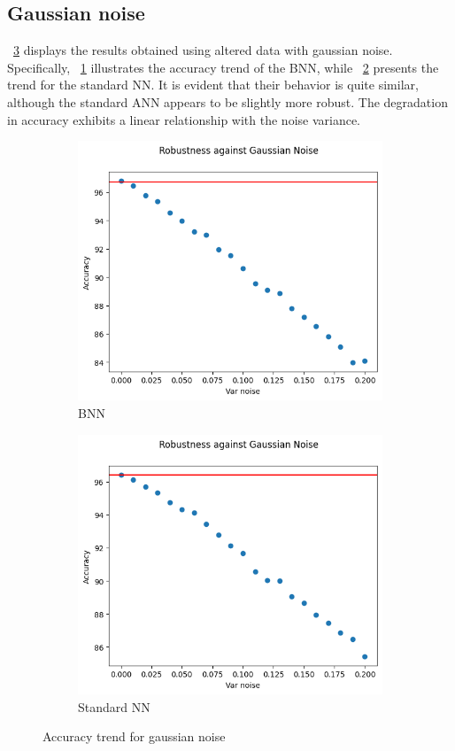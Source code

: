 \subsection{Gaussian noise}

\Fig~\ref{fig:acc_gn_wu} displays the results obtained using altered data with gaussian noise. Specifically, \Fig~\ref{fig:gn_acc_wu_bnn} illustrates the accuracy trend of the BNN, while \Fig~\ref{fig:gaus_noise_ann} presents the trend for the standard NN. It is evident that their behavior is quite similar, although the standard ANN appears to be slightly more robust. The degradation in accuracy exhibits a linear relationship with the noise variance.

\begin{figure}[h]
	\centering
	\begin{subfigure}{.5\textwidth}
		\centering
		\includegraphics[width=0.8\linewidth]{ImageFiles/EvalBNN/GN/WU/acc}
		\caption{BNN}
		\label{fig:gn_acc_wu_bnn}
	\end{subfigure}%
	\begin{subfigure}{.5\textwidth}
		\centering
		\includegraphics[width=0.8\linewidth]{ImageFiles/EvalANN/gaus_noise_ann}
		\caption{Standard NN}
		\label{fig:gaus_noise_ann}
	\end{subfigure}
	\caption{Accuracy trend for gaussian noise}
	\label{fig:acc_gn_wu}
\end{figure}

